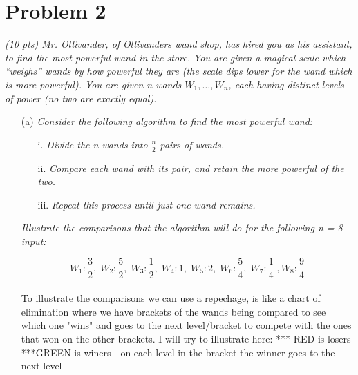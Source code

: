 \documentclass[11pt]{article} \setlength{\oddsidemargin}{0in}
\begin{document}
{\newpage

  \section*{Problem 2}

  \textit{(10 pts) Mr. Ollivander, of Ollivanders wand shop, has hired
    you as his assistant, to find the most powerful wand in the
    store. You are given a magical scale which ``weighs'' wands by how
    powerful they are (the scale dips lower for the wand which is more
    powerful). You are given n wands $W_1, \dots ,W_n$, each having
    distinct levels of power (no two are exactly equal).}

  \begin{enumerate}
  \item[(a)]{\textit{Consider the following algorithm to find the most %
        powerful wand:}}
    \begin{enumerate}
    \item[i.] \textit{Divide the n wands into $\frac{n}{2}$ pairs of
        wands.}
    \item[ii.] \textit{Compare each wand with its pair, and retain the
        more powerful of the two.}
    \item[iii.] \textit{Repeat this process until just one wand
        remains.}
    \end{enumerate}

    \textit{Illustrate the comparisons that the algorithm will do for
      the following n = 8 input:}

    $$
    W_1:\frac{3}{2},\; W_2:\frac{5}{2},\; W_3:\frac{1}{2},\; W_4:1,\;
    W_5:2,\; W_6:\frac{5}{4},\; W_7:\frac{1}{4}\;, W_8:\frac{9}{4}
    $$
    \\

To illustrate the comparisons we can use a repechage, is like a chart of elimination where we have brackets of the wands being compared to see which one "wins" and goes to the next level/bracket to compete with the ones that won on the other brackets. I will try to illustrate here:  *** RED is losers ***GREEN is winers - on each level in the bracket the winner goes to the next level\\\\


\end{enumerate}}
\end{document}
